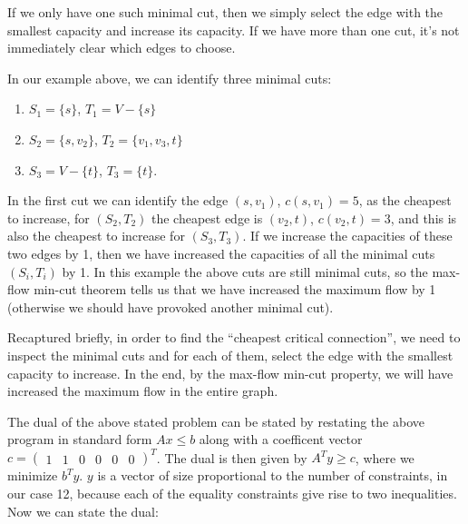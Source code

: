 \documentclass{article}
\begin{document}
If we only have one such minimal cut, then we simply select the edge
with the smallest capacity and increase its capacity. If we have more
than one cut, it's not immediately clear which edges to choose.

In our example above, we can identify three minimal cuts:
\begin{enumerate}
  \item $S_1 = \{s\}$, $T_1 = V - \{s\}$
  \item $S_2 = \{s,v_2\}$, $T_2 = \{v_1,v_3,t \}$
  \item $S_3 = V - \{t\}$, $T_3 = \{t\}$.
\end{enumerate}

In the first cut we can identify the edge $(s, v_1)$, $c(s,v_1) = 5$,
as the cheapest to increase, for $(S_2,T_2)$ the cheapest edge is
$(v_2,t)$, $c(v_2,t) = 3$, and this is also the cheapest to increase
for $(S_3, T_3)$. If we increase the capacities of these two edges by
1, then we have increased the capacities of all the minimal cuts
$(S_i,T_i)$ by 1. In this example the above cuts are still minimal
cuts, so the max-flow min-cut theorem tells us that we have increased
the maximum flow by 1 (otherwise we should have provoked another
minimal cut).

Recaptured briefly, in order to find the ``cheapest critical
connection'', we need to inspect the minimal cuts and for each of
them, select the edge with the smallest capacity to increase. In the
end, by the max-flow min-cut property, we will have increased the
maximum flow in the entire graph.


The dual of the above stated problem can be stated by restating the
above program in standard form $Ax\leq b$ along with a coefficent
vector $c = \begin{pmatrix} 1 & 1 & 0 & 0 & 0 & 0\end{pmatrix}^T$. The
  dual is then given by $A^Ty \geq c$, where we minimize $b^Ty$. $y$
  is a vector of size proportional to the number of constraints, in
  our case 12, because each of the equality constraints give rise to
  two inequalities. Now we can state the dual:
\end{document}
